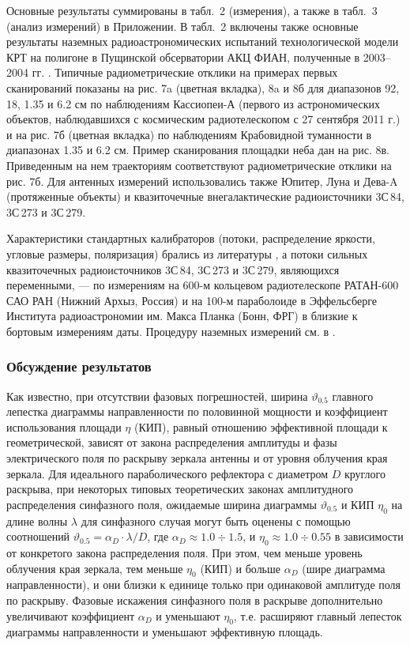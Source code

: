 Основные результаты суммированы в табл.~2 (измерения), а также в табл.~3 (анализ измерений) в
Приложении. В табл.~2 включены также основные результаты наземных радиоастрономических испытаний
технологической модели КРТ на полигоне в Пущинской обсерватории АКЦ ФИАН, полученные в 2003--2004
гг. \cite{SRT_report_2004}. Типичные радиометрические отклики на примерах первых сканирований
показаны на рис. 7a (цветная вкладка), 8a и 8б для диапазонов 92, 18, 1.35 и 6.2 см по наблюдениям
Кассиопеи-А (первого из астрономических объектов, наблюдавшихся с космическим радиотелескопом с 27
сентября 2011 г.) и на рис. 7б (цветная вкладка) по наблюдениям Крабовидной туманности в диапазонах
1.35 и 6.2 см. Пример сканирования площадки неба дан на рис. 8в. Приведенным на нем траекториям
соответствуют радиометрические отклики на рис. 7б. Для антенных измерений использовались также
Юпитер, Луна и Дева-A (протяженные объекты) и квазиточечные внегалактические радиоисточники 3С\,84,
3С\,273 и 3С\,279.

Характеристики  стандартных калибраторов (потоки, распределение яркости, угловые размеры,
поляризация) брались из литературы \cite{Baars_1977}, а потоки сильных квазиточечных радиоисточников
3С\,84, 3С\,273 и 3С\,279, являющихся переменными, --- по измерениям на 600-м кольцевом
радиотелескопе РАТАН-600 САО РАН (Нижний Архыз, Россия) и на 100-м параболоиде в Эффельсберге
Института радиоастрономии им. Макса Планка (Бонн, ФРГ) \cite{FGAMMA} в близкие к бортовым
измерениям даты. Процедуру наземных измерений см. в \cite{Kovalev_1999}.


\subsubsection{Обсуждение результатов}

Как известно, при отсутствии фазовых погрешностей, ширина $\vartheta_{0.5}$ главного лепестка
диаграммы направленности по половинной мощности и коэффициент использования площади $\eta$ (КИП),
равный отношению эффективной площади к геометрической, зависят от закона распределения амплитуды и
фазы электрического поля по раскрыву зеркала антенны и от уровня облучения края зеркала. Для
идеального параболического рефлектора с диаметром $D$ круглого раскрыва, при некоторых типовых
теоретических законах амплитудного распределения синфазного поля, ожидаемые ширина диаграммы
$\vartheta_{0.5}$ и КИП $\eta_0$ на длине волны $\lambda$ для синфазного случая могут быть оценены с
помощью соотношений \cite{Hansen_1966,Ajzenberg_1977,Christiansen_1972} $\vartheta_{0.5} = \alpha_D
\cdot \lambda / D$, где $\alpha_D \approx 1.0 \div 1.5$, и $\eta_0 \approx 1.0 \div 0.55$ в
зависимости от конкретого закона распределения поля. При этом, чем меньше уровень облучения края
зеркала, тем меньше $\eta_0$ (КИП) и больше $\alpha_D$ (шире диаграмма направленности), и они близки
к единице только при одинаковой амплитуде поля по раскрыву. Фазовые искажения синфазного поля в
раскрыве дополнительно увеличивают коэффициент $\alpha_D$ и уменьшают $\eta_0$, т.е. расширяют
главный лепесток диаграммы направленности и уменьшают эффективную площадь.

